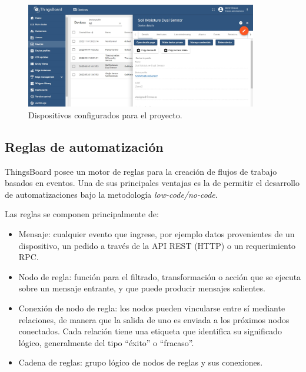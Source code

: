 \begin{figure}[!h]
	\centering
	\includegraphics[width=0.9\textwidth]{./Figures/chapter3/TB_Devices2.jpg}
	\caption[Dispositivos configurados para el proyecto]{Dispositivos configurados para el proyecto.}
	\label{fig:tb_devices}
\end{figure}



\subsection{Reglas de automatización}
\label{sec:Reglas de automatización}
 
 
ThingsBoard posee un motor de reglas \citep{TB_Rules} para la creación de flujos de trabajo basados en eventos. Una de sus principales ventajas es la de permitir el desarrollo de automatizaciones bajo la metodología \textit{low-code/no-code}\citep{lcnc}.

Las reglas se componen principalmente de:
 
 \begin{itemize}
 \item Mensaje: cualquier evento que ingrese, por ejemplo datos provenientes de un dispositivo, un pedido a través de la API REST (HTTP) o un requerimiento RPC.
 \item Nodo de regla: función para el filtrado, transformación o acción que se ejecuta sobre un mensaje entrante, y que puede producir mensajes salientes.
\item Conexión de nodo de regla: los nodos pueden vincularse entre sí mediante relaciones, de manera que la salida de uno es enviada a los próximos nodos conectados. Cada relación tiene una etiqueta que identifica su significado lógico, generalmente del tipo ``éxito'' o ``fracaso''.
\item Cadena de reglas: grupo lógico de nodos de reglas y sus conexiones.

 \end{itemize}


